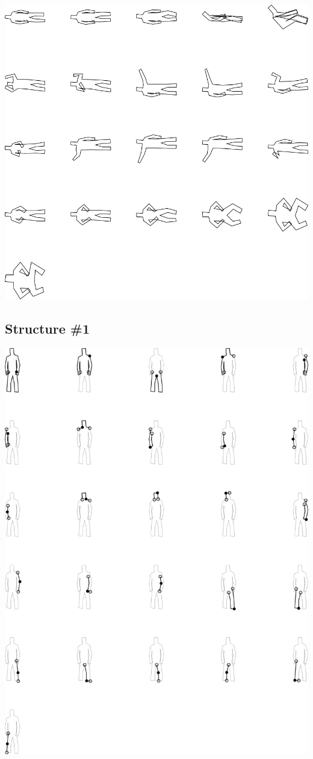 \includegraphics[width=6in]{output/3.learning/learning_setup/learning_setup_validation_.png}
\subsection{Structure \#1}

\includegraphics[width=6in]{output/3.learning/learning_setup/learning_setup_sdf0_.png}

